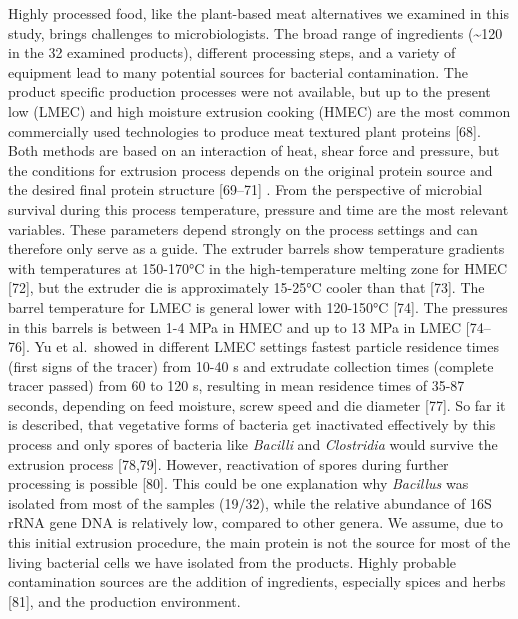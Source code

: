 \documentclass[preprint,3p,
a4paper]{elsarticle} %
\begin{document}
Highly processed food, like the plant-based meat alternatives we
examined in this study, brings challenges to microbiologists. The broad
range of ingredients (\textasciitilde120 in the 32 examined products),
different processing steps, and a variety of equipment lead to many
potential sources for bacterial contamination. The product specific
production processes were not available, but up to the present low
(LMEC) and high moisture extrusion cooking (HMEC) are the most common
commercially used technologies to produce meat textured plant proteins
{[}68{]}. Both methods are based on an interaction of heat, shear force
and pressure, but the conditions for extrusion process depends on the
original protein source and the desired final protein structure
{[}69--71{]} . From the perspective of microbial survival during this
process temperature, pressure and time are the most relevant variables.
These parameters depend strongly on the process settings and can
therefore only serve as a guide. The extruder barrels show temperature
gradients with temperatures at 150-170°C in the high-temperature melting
zone for HMEC {[}72{]}, but the extruder die is approximately 15-25°C
cooler than that {[}73{]}. The barrel temperature for LMEC is general
lower with 120-150°C {[}74{]}. The pressures in this barrels is between
1-4 MPa in HMEC and up to 13 MPa in LMEC {[}74--76{]}. Yu et al.~showed
in different LMEC settings fastest particle residence times (first signs
of the tracer) from 10-40 s and extrudate collection times (complete
tracer passed) from 60 to 120 s, resulting in mean residence times of
35-87 seconds, depending on feed moisture, screw speed and die diameter
{[}77{]}. So far it is described, that vegetative forms of bacteria get
inactivated effectively by this process and only spores of bacteria like
\emph{Bacilli} and \emph{Clostridia} would survive the extrusion process
{[}78,79{]}. However, reactivation of spores during further processing
is possible {[}80{]}. This could be one explanation why \emph{Bacillus}
was isolated from most of the samples (19/32), while the relative
abundance of 16S rRNA gene DNA is relatively low, compared to other
genera. We assume, due to this initial extrusion procedure, the main
protein is not the source for most of the living bacterial cells we have
isolated from the products. Highly probable contamination sources are
the addition of ingredients, especially spices and herbs {[}81{]}, and
the production environment.
\end{document}
